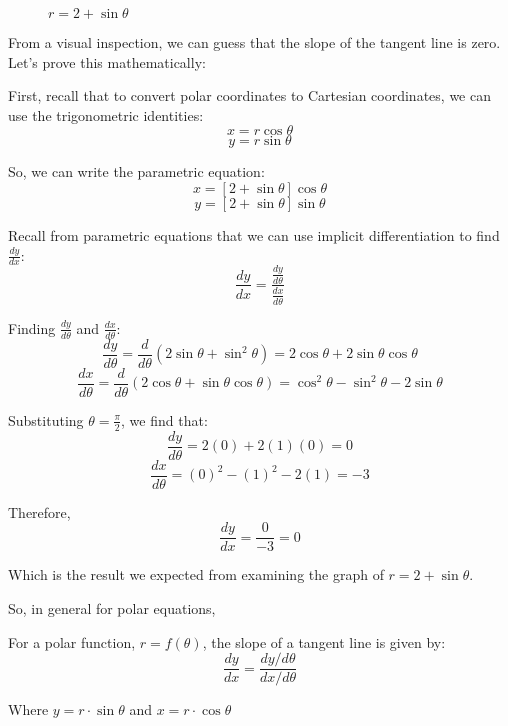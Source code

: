 \begin{figure}[htbp]
\centering
    \label{fig:cardioid}
    \caption{$r = 2 + \sin{\theta}$}
    \end{figure}

From a visual inspection, we can guess that the slope of the tangent line is 
zero. Let's prove this mathematically:

First, recall that to convert polar coordinates to Cartesian coordinates, we 
can use the trigonometric identities:
$$x = r\cos{\theta}$$
$$y = r\sin{\theta}$$

So, we can write the parametric equation:
$$x = \left[2 + \sin{\theta} \right]\cos{\theta}$$
$$y = \left[ 2 + \sin{\theta} \right]\sin{\theta}$$

Recall from parametric equations that we can use implicit differentiation to 
find $\frac{dy}{dx}$:
$$\frac{dy}{dx} = \frac{\frac{dy}{d\theta}}{\frac{dx}{d\theta}}$$

Finding $\frac{dy}{d\theta}$ and $\frac{dx}{d\theta}$:
$$\frac{dy}{d\theta} = \frac{d}{d\theta} \left( 2\sin{\theta} + \sin^2{\theta} 
\right) = 2\cos{\theta} + 2\sin{\theta}\cos{\theta}$$
$$\frac{dx}{d\theta} = \frac{d}{d\theta} \left( 2\cos{\theta} + \sin{\theta}
\cos{\theta} \right) = \cos^2{\theta} - \sin^2{\theta} - 2\sin{\theta}$$

Substituting $\theta = \frac{\pi}{2}$, we find that:
$$\frac{dy}{d\theta} = 2(0) + 2(1)(0) = 0$$
$$\frac{dx}{d\theta} = (0)^2 - (1)^2 - 2(1) = -3$$

Therefore,
$$\frac{dy}{dx} = \frac{0}{-3} = 0$$

Which is the result we expected from examining the graph of $r = 2 + \sin{
\theta}$. 

So, in general for polar equations, 
\begin{mdframed}[style=important, frametitle={Tangent to a Polar Function}]
For a polar function, $r = f(\theta)$, the slope of a tangent line is given by:
$$\frac{dy}{dx} = \frac{dy/d\theta}{dx/d\theta}$$

Where $y = r \cdot \sin{\theta}$ and $x = r \cdot \cos{\theta}$
\end{mdframed}

